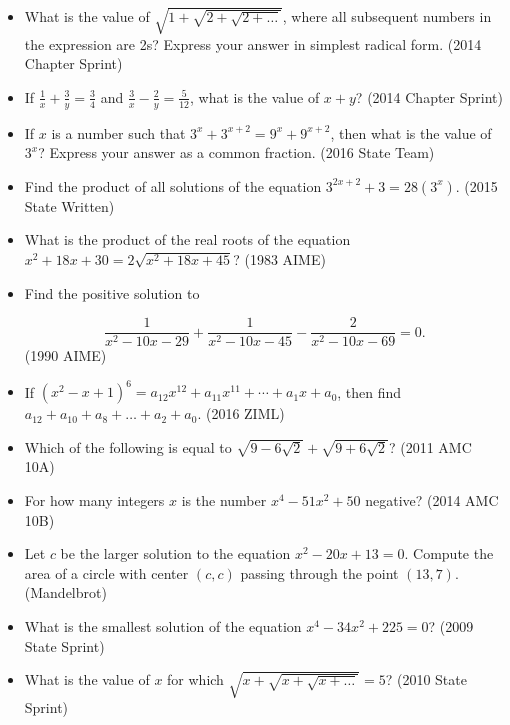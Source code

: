 \documentclass{article}
\begin{document}
\begin{itemize}


\item What is the value of $\sqrt{1+\sqrt{2+\sqrt{2+\ldots}}}$, where all subsequent numbers in the expression are 2s? Express your answer in simplest radical form. (2014 Chapter Sprint)

\item If $\frac{1}{x}+\frac{3}{y}=\frac{3}{4}$ and $\frac{3}{x}-\frac{2}{y}=\frac{5}{12}$, what is the value of $x+y$? (2014 Chapter Sprint)

\item If $x$ is a number such that $3^x+3^{x+2}=9^x+9^{x+2}$, then what is the value of $3^x$? Express your answer as a common fraction. (2016 State Team)

\item Find the product of all solutions of the equation $3^{2x+2}+3=28(3^x)$. (2015 State Written)

\item What is the product of the real roots of the equation $x^2+18x+30=2\sqrt{x^2+18x+45}$? (1983 AIME)

\item Find the positive solution to 

$$\frac{1}{x^2-10x-29}+\frac{1}{x^2-10x-45}-\frac{2}{x^2-10x-69}=0.$$ (1990 AIME)

\item If $(x^2-x+1)^6=a_{12}x^{12}+a_{11}x^{11}+\cdots+a_1x+a_0$, then find $a_{12}+a_{10}+a_8+\ldots+a_2+a_0$. (2016 ZIML)

\item Which of the following is equal to $\sqrt{9-6\sqrt{2}}+\sqrt{9+6\sqrt{2}}$? (2011 AMC 10A)

\item For how many integers $x$ is the number $x^4-51x^2+50$ negative? (2014 AMC 10B)

\item Let $c$ be the larger solution to the equation $x^2-20x+13=0$. Compute the area of a circle with center $(c,c)$ passing through the point $(13,7)$. (Mandelbrot)

\item What is the smallest solution of the equation $x^4-34x^2+225=0$? (2009 State Sprint)

\item What is the value of $x$ for which $\sqrt{x+\sqrt{x+\sqrt{x+\ldots}}}=5$? (2010 State Sprint)


\end{itemize}
\end{document}
